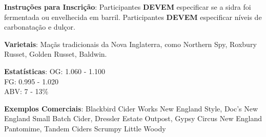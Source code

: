 \textbf{Instruções para Inscrição}: Participantes \textbf{DEVEM} especificar se a sidra foi fermentada ou envelhecida em barril. Participantes \textbf{DEVEM} especificar níveis de carbonatação e dulçor.

\textbf{Varietais}: Maçãs tradicionais da Nova Inglaterra, como Northern Spy, Roxbury Russet, Golden Russet, Baldwin.

\textbf{Estatísticas}: OG: 1.060 - 1.100 \\
\phantom{ } \hspace{16.5mm} FG: 0.995 - 1.020 \\
\phantom{ } \hspace{16.5mm} ABV: 7 - 13\%

\textbf{Exemplos Comerciais}: Blackbird Cider Works New England Style, Doc’s New England Small Batch Cider, Dressler Estate Outpost, Gypsy Circus New England Pantomime, Tandem Ciders Scrumpy Little Woody
